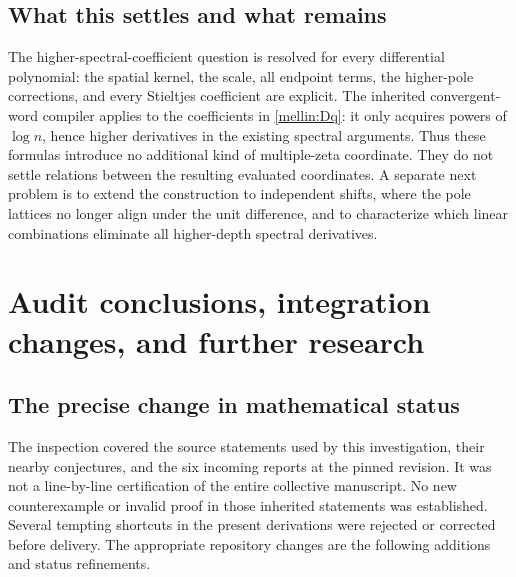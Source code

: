 \documentclass[11pt,letterpaper]{article}
\theoremstyle{definition}
\theoremstyle{remark}
\numberwithin{equation}{section}
\begin{document}
\subsection{What this settles and what remains}

The higher-spectral-coefficient question is resolved for every
differential polynomial: the spatial kernel, the scale, all endpoint
terms, the higher-pole corrections, and every Stieltjes coefficient are
explicit.  The inherited convergent-word compiler applies to the
coefficients in \eqref{mellin:Dq}: it only acquires powers of
$\log n$, hence higher derivatives in the existing spectral arguments.
Thus these formulas introduce no additional kind of multiple-zeta
coordinate.  They do not settle relations between the resulting
evaluated coordinates.  A separate next problem is to extend the
construction to independent shifts, where the pole lattices no longer
align under the unit difference, and to characterize which linear
combinations eliminate all higher-depth spectral derivatives.



\section{Audit conclusions, integration changes, and further research}
\label{sec:audit-research}

\subsection{The precise change in mathematical status}

The inspection covered the source statements used by this investigation,
their nearby conjectures, and the six incoming reports at the pinned
revision. It was not a line-by-line certification of the entire collective
manuscript. No new counterexample or invalid proof in those inherited
statements was established. Several tempting shortcuts in the present
derivations were rejected or corrected before delivery. The appropriate
repository changes are the following additions and status refinements.
\end{document}
